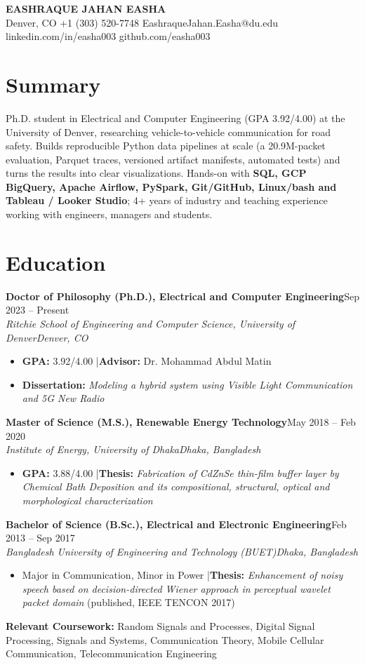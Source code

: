 \documentclass[10pt,letterpaper]{article}
\newcommand{\entry}[4]{\textbf{#1}\hfill #2\\\textit{#3}\hfill\textit{#4}\par}
\begin{document}
\begin{center}{\LARGE\bfseries\color{accent} EASHRAQUE JAHAN EASHA}\\[3pt]
Denver, CO \textbar{} +1 (303) 520-7748 \textbar{} EashraqueJahan.Easha@du.edu \textbar{} linkedin.com/in/easha003 \textbar{} github.com/easha003\end{center}\vspace{-6pt}
\section*{Summary}
Ph.D. student in Electrical and Computer Engineering (GPA 3.92/4.00) at the University of Denver, researching vehicle-to-vehicle communication for road safety. Builds reproducible Python data pipelines at scale (a 20.9M-packet evaluation, Parquet traces, versioned artifact manifests, automated tests) and turns the results into clear visualizations. Hands-on with \textbf{SQL, GCP BigQuery, Apache Airflow, PySpark, Git/GitHub, Linux/bash and Tableau / Looker Studio}; 4+ years of industry and teaching experience working with engineers, managers and students.
\section*{Education}
\entry{Doctor of Philosophy (Ph.D.), Electrical and Computer Engineering}{Sep 2023 – Present}{Ritchie School of Engineering and Computer Science, University of Denver}{Denver, CO}
\begin{itemize}\item \textbf{GPA:} 3.92/4.00 \quad|\quad \textbf{Advisor:} Dr. Mohammad Abdul Matin\item \textbf{Dissertation:} \textit{Modeling a hybrid system using Visible Light Communication and 5G New Radio}\end{itemize}
\vspace{2pt}
\entry{Master of Science (M.S.), Renewable Energy Technology}{May 2018 – Feb 2020}{Institute of Energy, University of Dhaka}{Dhaka, Bangladesh}
\begin{itemize}\item \textbf{GPA:} 3.88/4.00 \quad|\quad \textbf{Thesis:} \textit{Fabrication of CdZnSe thin-film buffer layer by Chemical Bath Deposition and its compositional, structural, optical and morphological characterization}\end{itemize}
\vspace{2pt}
\entry{Bachelor of Science (B.Sc.), Electrical and Electronic Engineering}{Feb 2013 – Sep 2017}{Bangladesh University of Engineering and Technology (BUET)}{Dhaka, Bangladesh}
\begin{itemize}\item Major in Communication, Minor in Power \quad|\quad \textbf{Thesis:} \textit{Enhancement of noisy speech based on decision-directed Wiener approach in perceptual wavelet packet domain} (published, IEEE TENCON 2017)\end{itemize}
\vspace{2pt}
\textbf{Relevant Coursework:} Random Signals and Processes, Digital Signal Processing, Signals and Systems, Communication Theory, Mobile Cellular Communication, Telecommunication Engineering
\end{document}
